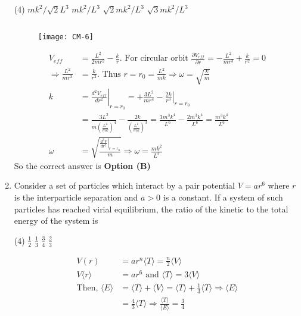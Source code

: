 \begin{enumerate}
{	}
\begin{tasks}(4)
\task[\textbf{A.}] $m k^{2} / \sqrt{2} L^{3}$
\task[\textbf{B.}] $m k^{2} / L^{3}$
\task[\textbf{C.}] $\sqrt{2} m k^{2} / L^{3}$
\task[\textbf{D.}] $\sqrt{3} m k^{2} / L^{3}$
\end{tasks}
\begin{answer}$\left. \right. $
\begin{figure}[H]
	\centering
	\texttt{[image: CM-6]}
\end{figure}
\begin{align*}
V_{e f f}&=\frac{L^{2}}{2 m r^{2}}-\frac{k}{r} .\text{ For circular orbit }\frac{\partial V_{e f f}}{\partial r}=-\frac{L^{2}}{m r^{3}}+\frac{k}{r^{2}}=0\\
\Rightarrow \frac{L^{2}}{m r^{3}}&=\frac{k}{r^{2}} .\text{ Thus }r=r_{0}=\frac{L^{2}}{m k} \Rightarrow \omega=\sqrt{\frac{k}{m}}\\
k&=\left.\frac{d^{2} V_{e f f}}{d r^{2}}\right|_{r=r_{0}}=+\frac{3 L^{2}}{m r^{4}}-\left.\frac{2 k}{r^{3}}\right|_{r=r_{0}}\\&=\frac{3 L^{2}}{m\left(\frac{L^{2}}{m k}\right)^{4}}-\frac{2 k}{\left(\frac{L^{2}}{m k}\right)^{3}}=\frac{3 m^{3} k^{4}}{L^{6}}-\frac{2 m^{3} k^{4}}{L^{6}}=\frac{m^{3} k^{4}}{L^{6}}\\
\omega&=\sqrt{\frac{\left.\frac{d^{2} V}{d r^{2}}\right|_{r=r_{0}}}{m}} \Rightarrow \omega=\frac{m k^{2}}{L^{3}}
\end{align*}
So the correct answer is \textbf{Option (B)}
\end{answer}
	\item Consider a set of particles which interact by a pair potential $V=a r^{6}$ where $r$ is the interparticle separation and $a>0$ is a constant. If a system of such particles has reached virial equilibrium, the ratio of the kinetic to the total energy of the system is
{	}
\begin{tasks}(4)
\task[\textbf{A.}] $\frac{1}{2}$
\task[\textbf{B.}] $\frac{1}{3}$
\task[\textbf{C.}] $\frac{3}{4}$
\task[\textbf{D.}] $\frac{2}{3}$
\end{tasks}
\begin{answer}
\begin{align*}
V(r)&=a r^{n}\langle T\rangle=\frac{n}{2}\langle V\rangle\\
V\langle r\rangle&=a r^{6}\text{ and }\langle T\rangle=3\langle V\rangle\\
\text{Then, }\langle E\rangle&=\langle T\rangle+\langle V\rangle=\langle T\rangle+\frac{1}{3}\langle T\rangle \Rightarrow\langle E\rangle\\&=\frac{4}{3}\langle T\rangle \Rightarrow \frac{\langle T\rangle}{\langle E\rangle}=\frac{3}{4}

\end{align*}
\end{answer}
\end{enumerate}
